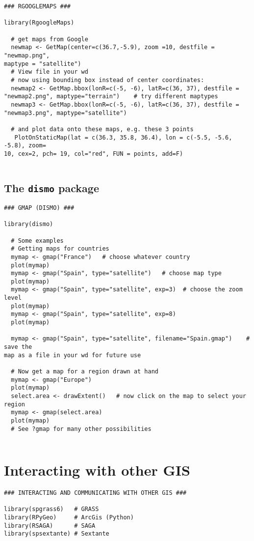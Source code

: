 \documentclass[11pt]{article} %
\begin{document}
\begin{verbatim} 
### RGOOGLEMAPS ###
 
library(RgoogleMaps)
 
  # get maps from Google
  newmap <- GetMap(center=c(36.7,-5.9), zoom =10, destfile = "newmap.png",
maptype = "satellite")
  # View file in your wd
  # now using bounding box instead of center coordinates:
  newmap2 <- GetMap.bbox(lonR=c(-5, -6), latR=c(36, 37), destfile =
"newmap2.png", maptype="terrain")    # try different maptypes
  newmap3 <- GetMap.bbox(lonR=c(-5, -6), latR=c(36, 37), destfile =
"newmap3.png", maptype="satellite")
 
  # and plot data onto these maps, e.g. these 3 points
   PlotOnStaticMap(lat = c(36.3, 35.8, 36.4), lon = c(-5.5, -5.6, -5.8), zoom=
10, cex=2, pch= 19, col="red", FUN = points, add=F)
 
 \end{verbatim}
\subsection{The \texttt{dismo} package}
\begin{verbatim}
### GMAP (DISMO) ###
 
library(dismo)
 
  # Some examples
  # Getting maps for countries
  mymap <- gmap("France")   # choose whatever country
  plot(mymap)
  mymap <- gmap("Spain", type="satellite")   # choose map type
  plot(mymap)
  mymap <- gmap("Spain", type="satellite", exp=3)  # choose the zoom level
  plot(mymap)
  mymap <- gmap("Spain", type="satellite", exp=8)
  plot(mymap)
 
  mymap <- gmap("Spain", type="satellite", filename="Spain.gmap")    # save the
map as a file in your wd for future use
 
  # Now get a map for a region drawn at hand
  mymap <- gmap("Europe")
  plot(mymap)
  select.area <- drawExtent()   # now click on the map to select your region
  mymap <- gmap(select.area)
  plot(mymap)
  # See ?gmap for many other possibilities
 
\end{verbatim}
\newpage


\newpage
\section{Interacting with other GIS}
\begin{framed}
\begin{verbatim}
### INTERACTING AND COMMUNICATING WITH OTHER GIS ###
 
library(spgrass6)   # GRASS
library(RPyGeo)     # ArcGis (Python)
library(RSAGA)      # SAGA
library(spsextante) # Sextante
\end{verbatim}
\end{framed}
\end{document}
